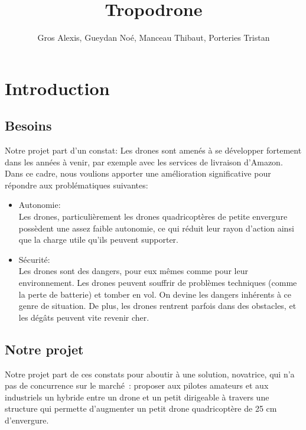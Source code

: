 \documentclass[a4paper,11pt]{article}
\title{Tropodrone}
\author{Gros Alexis, Gueydan Noé, Manceau Thibaut, Porteries Tristan}
\begin{document}
\begin{Huge}
\maketitle
\end{Huge}

\clearpage

\tableofcontents

\clearpage

\section{Introduction}

\subsection{Besoins}
Notre projet part d'un constat: Les drones sont amenés à se développer fortement dans les années à venir, par exemple avec les services de livraison d'Amazon. Dans ce cadre, nous voulions apporter une amélioration significative pour répondre aux problématiques suivantes:
\begin{itemize}
	\item Autonomie: \\
		Les drones, particulièrement les drones quadricoptères de petite envergure possèdent une assez faible autonomie, ce qui réduit leur rayon d'action ainsi que la charge utile qu'ils peuvent supporter.
	\item Sécurité: \\
		Les drones sont des dangers, pour eux mêmes comme pour leur environnement. Les drones peuvent souffrir de problèmes techniques (comme la perte de batterie) et tomber en vol. On devine les dangers inhérents à ce genre de situation. De plus, les drones rentrent parfois dans des obstacles, et les dégâts peuvent vite revenir cher.
\end{itemize}

\subsection{Notre projet}
Notre projet part de ces constats pour aboutir à une solution, novatrice, qui n'a pas de concurrence sur le marché~: proposer aux pilotes amateurs et aux industriels un hybride entre un drone et un petit dirigeable à travers une structure qui permette d'augmenter un petit drone quadricoptère de 25 cm d'envergure.
\end{document}
